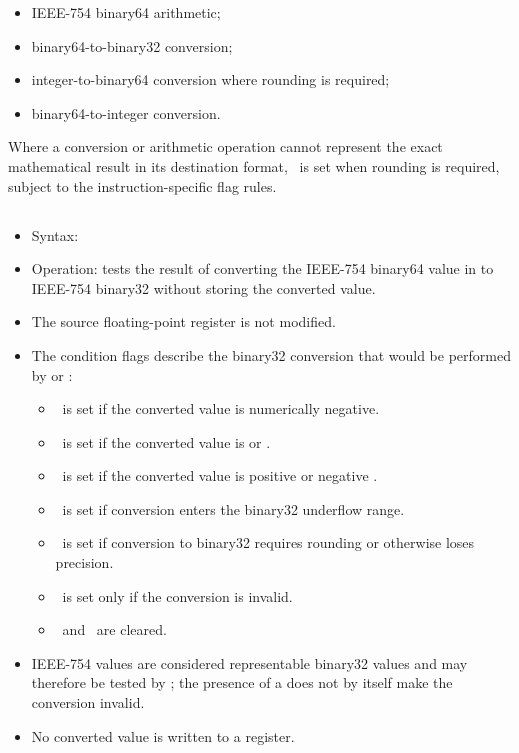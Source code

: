 \begin{itemize}
\item IEEE-754 binary64 arithmetic;
\item binary64-to-binary32 conversion;
\item integer-to-binary64 conversion where rounding is required;
\item binary64-to-integer conversion.
\end{itemize}

Where a conversion or arithmetic operation cannot represent the exact
mathematical result in its destination format, \flagX\ is set when rounding
is required, subject to the instruction-specific flag rules.

\subsection{}

\begin{itemize}
\item Syntax: 
\item Operation: tests the result of converting the IEEE-754 binary64 value
      in  to IEEE-754 binary32 without storing the converted value.
\item The source floating-point register is not modified.
\item The condition flags describe the binary32 conversion that would be
      performed by  or :
      \begin{itemize}
      \item \flagN\ is set if the converted value is numerically negative.
      \item \flagZ\ is set if the converted value is  or .
      \item \flagI\ is set if the converted value is positive or negative
            .
      \item \flagU\ is set if conversion enters the binary32 underflow range.
      \item \flagX\ is set if conversion to binary32 requires rounding or
            otherwise loses precision.
      \item \flagE\ is set only if the conversion is invalid.
      \item \flagC\ and \flagV\ are cleared.
      \end{itemize}
\item IEEE-754  values are considered representable binary32
      values and may therefore be tested by ; the presence of a
       does not by itself make the conversion invalid.
\item No converted value is written to a register.
\end{itemize}

